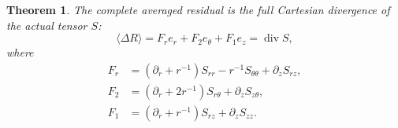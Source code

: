 \documentclass[11pt]{article}
\newtheorem{theorem}{Theorem}
\begin{document}
\begin{theorem}\label{mcstress:full_mean}
The complete averaged residual is the full Cartesian divergence of
the actual tensor $S$:
\begin{equation}\label{mcstress:Ffull}
 \langle\Delta R\rangle
 =F_r e_r+F_2e_\theta+F_1e_z
 =\operatorname{div}S,
\end{equation}
where
\begin{equation}\label{mcstress:all_components}
\begin{aligned}
 F_r&=(\partial_r+r^{-1})S_{rr}-r^{-1}S_{\theta\theta}
                                      +\partial_zS_{rz},\\
 F_2&=(\partial_r+2r^{-1})S_{r\theta}+\partial_zS_{z\theta},\\
 F_1&=(\partial_r+r^{-1})S_{rz}+\partial_zS_{zz}.
\end{aligned}
\end{equation}
\end{theorem}
\end{document}
